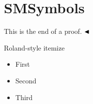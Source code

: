 \documentclass[class=scrartcl,crop=false]{standalone}
\begin{document}
\section{SMSymbols}

This is the end of a proof. $\tqed$

Roland-style itemize
\begin{itemize}
    \item[\itemarrow] First
    \item[\itemarrow] Second
    \item[\itemarrow] Third
\end{itemize}
\end{document}
